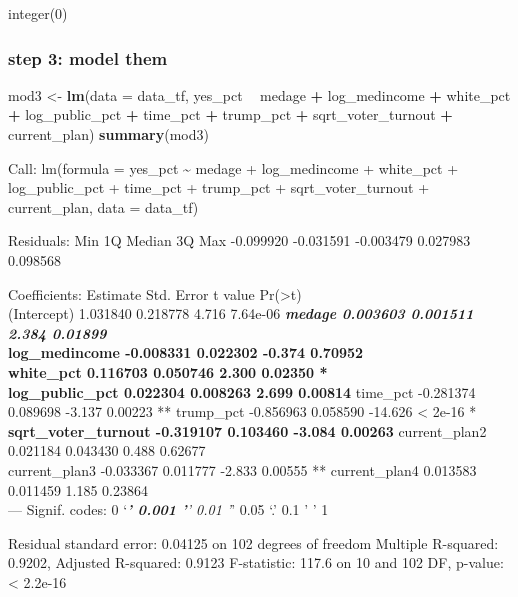 \documentclass[
]{article}
\newenvironment{Shaded}{\begin{snugshade}}{\end{snugshade}}
\newcommand{\DataTypeTok}[1]{\textcolor[rgb]{0.13,0.29,0.53}{#1}}
\newcommand{\KeywordTok}[1]{\textcolor[rgb]{0.13,0.29,0.53}{\textbf{#1}}}
\newcommand{\NormalTok}[1]{#1}
\newcommand{\OperatorTok}[1]{\textcolor[rgb]{0.81,0.36,0.00}{\textbf{#1}}}
\newcommand{\StringTok}[1]{\textcolor[rgb]{0.31,0.60,0.02}{#1}}
\begin{document}
integer(0)

\hypertarget{step-3-model-them}{%
\subsubsection{step 3: model them}\label{step-3-model-them}}

\begin{Shaded}
\begin{Highlighting}[]
\NormalTok{mod3 <-}\StringTok{ }\KeywordTok{lm}\NormalTok{(}\DataTypeTok{data =}\NormalTok{ data_tf, yes_pct }\OperatorTok{~}\StringTok{ }\NormalTok{medage }\OperatorTok{+}\StringTok{ }\NormalTok{log_medincome }\OperatorTok{+}\StringTok{ }\NormalTok{white_pct }\OperatorTok{+}\StringTok{ }\NormalTok{log_public_pct }\OperatorTok{+}\StringTok{ }\NormalTok{time_pct }\OperatorTok{+}\StringTok{ }\NormalTok{trump_pct }\OperatorTok{+}\StringTok{ }\NormalTok{sqrt_voter_turnout }\OperatorTok{+}\StringTok{ }\NormalTok{current_plan)}
\KeywordTok{summary}\NormalTok{(mod3)}
\end{Highlighting}
\end{Shaded}

Call: lm(formula = yes\_pct \textasciitilde{} medage + log\_medincome +
white\_pct + log\_public\_pct + time\_pct + trump\_pct +
sqrt\_voter\_turnout + current\_plan, data = data\_tf)

Residuals: Min 1Q Median 3Q Max -0.099920 -0.031591 -0.003479 0.027983
0.098568

Coefficients: Estimate Std. Error t value
Pr(\textgreater\textbar t\textbar)\\
(Intercept) 1.031840 0.218778 4.716 7.64e-06 \textbf{\emph{ medage
0.003603 0.001511 2.384 0.01899 }\\
log\_medincome -0.008331 0.022302 -0.374 0.70952\\
white\_pct 0.116703 0.050746 2.300 0.02350 *\\
log\_public\_pct 0.022304 0.008263 2.699 0.00814 } time\_pct -0.281374
0.089698 -3.137 0.00223 ** trump\_pct -0.856963 0.058590 -14.626
\textless{} 2e-16 *\textbf{ sqrt\_voter\_turnout -0.319107 0.103460
-3.084 0.00263 } current\_plan2 0.021184 0.043430 0.488 0.62677\\
current\_plan3 -0.033367 0.011777 -2.833 0.00555 ** current\_plan4
0.013583 0.011459 1.185 0.23864\\
--- Signif. codes: 0 `\emph{\textbf{' 0.001 '}' 0.01 '}' 0.05 `.' 0.1 '
' 1

Residual standard error: 0.04125 on 102 degrees of freedom Multiple
R-squared: 0.9202, Adjusted R-squared: 0.9123 F-statistic: 117.6 on 10
and 102 DF, p-value: \textless{} 2.2e-16
\end{document}
